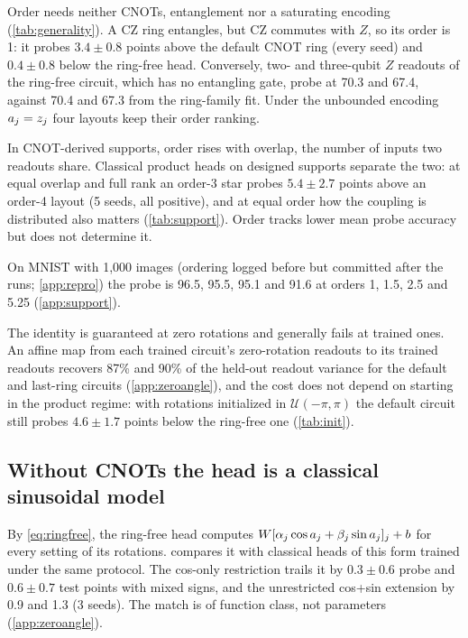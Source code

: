 

Order needs neither CNOTs, entanglement nor a saturating encoding (\cref{tab:generality}). A CZ ring entangles, but CZ commutes with $Z$, so its order is 1: it probes $3.4\pm0.8$ points above the default CNOT ring (every seed) and
$0.4\pm0.8$ below the ring-free head. Conversely, two- and three-qubit $Z$ readouts of the
ring-free circuit, which has no entangling gate, probe at 70.3 and 67.4, against 70.4 and 67.3 from
the ring-family fit. Under the unbounded encoding $a_{j}=z_j$ four layouts keep their order ranking.

In CNOT-derived supports, order rises with overlap, the number of inputs two readouts share.
Classical product heads on designed supports separate the two: at equal overlap and full rank an
order-3 star probes $5.4\pm2.7$ points above an order-4 layout (5 seeds, all positive), and at equal
order how the coupling is distributed also matters (\cref{tab:support}). Order tracks lower mean
probe accuracy but does not determine it.

On MNIST with 1,000 images (ordering logged before but committed after the runs; \cref{app:repro}) the probe is 96.5, 95.5, 95.1 and 91.6 at orders 1, 1.5, 2.5 and 5.25 (\cref{app:support}).

The identity is guaranteed at zero rotations and generally fails at trained ones. An affine map from each trained circuit's zero-rotation
readouts to its trained readouts recovers 87\% and 90\% of the held-out readout variance for the
default and last-ring circuits (\cref{app:zeroangle}), and the cost does not depend on starting in the
product regime: with rotations initialized in $\mathcal{U}(-\pi,\pi)$ the default circuit still probes
$4.6\pm1.7$ points below the ring-free one (\cref{tab:init}).

\subsection{Without CNOTs the head is a classical sinusoidal model}
\label{sec:sinusoid}



By \cref{eq:ringfree}, the ring-free head computes
$W[\alpha_j\cos a_{j}+\beta_j\sin a_{j}]_j+b$ for every setting of its rotations.
 compares it with classical heads of this form trained under the same
protocol. The cos-only restriction trails it by $0.3\pm0.6$ probe and $0.6\pm0.7$ test points
with mixed signs, and the unrestricted cos+sin extension by 0.9 and 1.3 (3 seeds). The match
is of function class, not parameters (\cref{app:zeroangle}).

